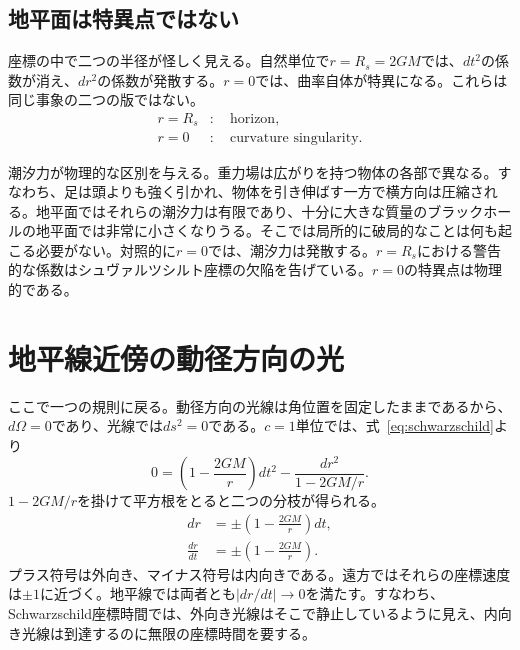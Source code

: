 
\subsection{地平面は特異点ではない}

座標の中で二つの半径が怪しく見える。自然単位で\(r=R_s=2GM\)では、\(dt^2\)の係数が消え、\(dr^2\)の係数が発散する。\(r=0\)では、曲率自体が特異になる。これらは同じ事象の二つの版ではない。
\begin{equation}
\begin{aligned}
r=R_s &:\quad \text{horizon},\\
r=0 &:\quad \text{curvature singularity}.
\end{aligned}
\end{equation}

潮汐力が物理的な区別を与える。重力場は広がりを持つ物体の各部で異なる。すなわち、足は頭よりも強く引かれ、物体を引き伸ばす一方で横方向は圧縮される。地平面ではそれらの潮汐力は有限であり、十分に大きな質量のブラックホールの地平面では非常に小さくなりうる。そこでは局所的に破局的なことは何も起こる必要がない。対照的に\(r=0\)では、潮汐力は発散する。\(r=R_s\)における警告的な係数はシュヴァルツシルト座標の欠陥を告げている。\(r=0\)の特異点は物理的である。


\section{地平線近傍の動径方向の光}

ここで一つの規則に戻る。動径方向の光線は角位置を固定したままであるから、\(d\Omega=0\)であり、光線では\(ds^2=0\)である。\(c=1\)単位では、式~\eqref{eq:schwarzschild}より
\begin{equation}
0=\left(1-\frac{2GM}{r}\right)dt^2
-\frac{dr^2}{1-2GM/r}.
\end{equation}
\(1-2GM/r\)を掛けて平方根をとると二つの分枝が得られる。
\begin{align}
dr&=\pm\left(1-\frac{2GM}{r}\right)dt,\\
\frac{dr}{dt}&=\pm\left(1-\frac{2GM}{r}\right).
\label{eq:radial-null}
\end{align}
プラス符号は外向き、マイナス符号は内向きである。遠方ではそれらの座標速度は\(\pm1\)に近づく。地平線では両者とも\(\lvert dr/dt\rvert\to0\)を満たす。すなわち、Schwarzschild座標時間では、外向き光線はそこで静止しているように見え、内向き光線は到達するのに無限の座標時間を要する。

